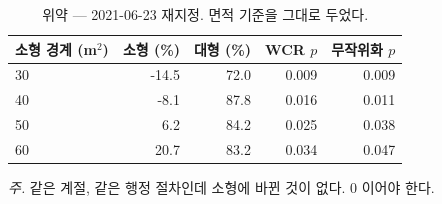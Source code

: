 \begin{table}[htbp]
  \centering
  \caption{위약 --- 2021-06-23 재지정. 면적 기준을 그대로 두었다.}
  \label{tab:area-2021}
  \begin{tabular}{lrrrr}
    \toprule
    \textbf{소형 경계 (m$^2$)} & \textbf{소형 (\%)} & \textbf{대형 (\%)} & \textbf{WCR $p$} & \textbf{무작위화 $p$} \\
    \midrule
    30 & -14.5 & 72.0 & 0.009 & 0.009 \\
    40 & -8.1 & 87.8 & 0.016 & 0.011 \\
    50 & 6.2 & 84.2 & 0.025 & 0.038 \\
    60 & 20.7 & 83.2 & 0.034 & 0.047 \\
    \bottomrule
  \end{tabular}

  \begin{minipage}{\linewidth}\footnotesize
  \textit{주.} 같은 계절, 같은 행정 절차인데 소형에 바뀐 것이 없다. 0 이어야 한다.
  \end{minipage}
\end{table}

